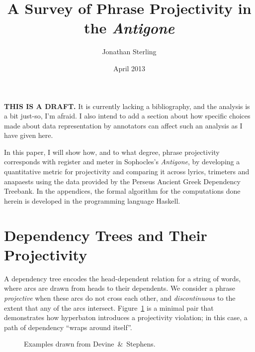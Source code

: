 \documentclass{article}
\begin{document}
\onehalfspacing
\setmainfont{Times New Roman}

\author{Jonathan Sterling}

\title{A Survey of Phrase Projectivity in the \emph{Antigone}}
\date{April 2013}
\maketitle


\noindent \textbf{THIS IS A DRAFT.} It is currently lacking a bibliography, and
the analysis is a bit just-so, I'm afraid. I also intend to add a section about
how specific choices made about data representation by annotators can affect
such an analysis as I have given here.

In this paper, I will show how, and to what degree, phrase projectivity
corresponds with register and meter in Sophocles's \emph{Antigone}, by
developing a quantitative metric for projectivity and comparing it across
lyrics, trimeters and anapaests using the data provided by the Perseus Ancient
Greek Dependency Treebank. In the appendices, the formal algorithm for the
computations done herein is developed in the programming language Haskell.

\section{Dependency Trees and Their Projectivity}

A dependency tree encodes the head-dependent relation for a string of words,
where arcs are drawn from heads to their dependents. We consider a phrase
\emph{projective} when these arcs do not cross each other, and
\emph{discontinuous} to the extent that any of the arcs intersect.
Figure~\ref{fig:dependency-trees1} is a minimal pair that demonstrates how
hyperbaton introduces a projectivity violation; in this case, a path of
dependency ``wraps around itself''.

\begin{figure}[h!]
\centering
{}
\hspace{6pt}

\caption{Examples drawn from Devine~\&~Stephens.}
\label{fig:dependency-trees1}
\end{figure}
\end{document}
